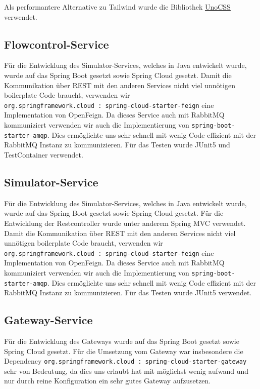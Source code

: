 Als performantere Alternative zu Tailwind wurde die Bibliothek \href{https://uno.antfu.me}{UnoCSS} verwendet.

\subsection{Flowcontrol-Service}
Für die Entwicklung des Simulator-Services, welches in Java entwickelt wurde, wurde auf das Spring Boot gesetzt sowie Spring Cloud gesetzt. Damit die Kommunikation über REST mit den anderen Services nicht viel unnötigen boilerplate Code braucht, verwenden wir \\ \verb|org.springframework.cloud : spring-cloud-starter-feign| eine Implementation von OpenFeign. Da dieses Service auch mit RabbitMQ kommuniziert verwenden wir auch die Implementierung von \verb|spring-boot-starter-amqp|. Dies ermöglichte uns sehr schnell mit wenig Code effizient mit der RabbitMQ Instanz zu kommunizieren. Für das Testen wurde JUnit5 und TestContainer verwendet.

\subsection{Simulator-Service}
Für die Entwicklung des Simulator-Services, welches in Java entwickelt wurde, wurde auf das Spring Boot gesetzt sowie Spring Cloud gesetzt. Für die Entwicklung der Restcontroller wurde unter anderem Spring MVC verwendet. Damit die Kommunikation über REST mit den anderen Services nicht viel unnötigen boilerplate Code braucht, verwenden wir \\ \verb|org.springframework.cloud : spring-cloud-starter-feign| eine Implementation von OpenFeign. Da dieses Service auch mit RabbitMQ kommuniziert verwenden wir auch die Implementierung von \verb|spring-boot-starter-amqp|. Dies ermöglichte uns sehr schnell mit wenig Code effizient mit der RabbitMQ Instanz zu kommunizieren. Für das Testen wurde JUnit5 verwendet.

\subsection{Gateway-Service}
Für die Entwicklung des Gateways wurde auf das Spring Boot gesetzt sowie Spring Cloud gesetzt. Für die Umsetzung vom Gateway war insbesondere die Dependency \verb|org.springframework.cloud : spring-cloud-starter-gateway| sehr von Bedeutung, da dies uns erlaubt hat mit möglichst wenig aufwand und nur durch reine Konfiguration ein sehr gutes Gateway aufzusetzen.
